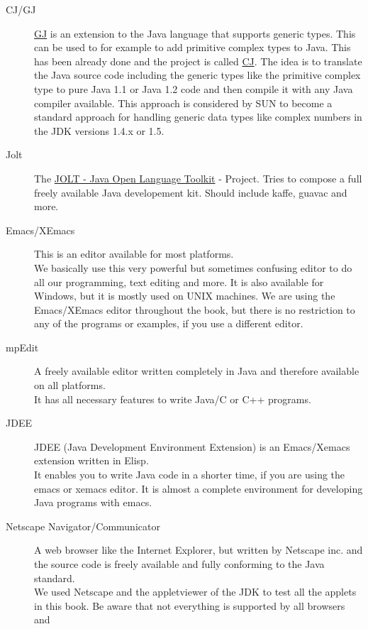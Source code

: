 \begin{description}
\item[CJ/GJ]  
  \href{http://wwwipd.ira.uka.de/~pizza/gj/}{GJ}
  is an extension to the Java language that supports
  generic types. This can be used to for example to add primitive
  complex types to Java. This has been already done and the project
  is called \href{http://wwwipd.ira.uka.de/~gunthner}{CJ}. 
  The idea is to translate the Java source code including
  the generic types like the primitive complex type to pure Java 1.1
  or Java 1.2 code and then compile it with any Java compiler available.
  This approach is considered by SUN to become a standard approach
  for handling generic data types like complex numbers 
  in the JDK versions 1.4.x or 1.5.
\item[Jolt] The \href{http://www.redhat.com/}
  {JOLT - Java Open Language Toolkit} - Project. Tries to
  compose a full freely available Java developement kit. Should
  include kaffe, guavac and more.
\item[Emacs/XEmacs] 
  This is an editor available for most platforms.\\
  We basically use this very powerful but sometimes confusing
  editor to do all our programming, text editing and more. It is
  also available for Windows, but it is mostly used on UNIX machines.
  We are using the Emacs/XEmacs editor throughout the book, but 
  there is no restriction to any of the programs or examples, if
  you use a different editor.
\item[mpEdit]  A freely available editor written completely in Java and
  therefore available on all platforms.\\ 
  It has all necessary features to write Java/C or C++ programs.
\item[JDEE]  JDEE (Java Development Environment Extension) 
  is an Emacs/Xemacs extension
  written in Elisp. \\
  It enables you to write Java code in a shorter time, if you are
  using the emacs or xemacs editor. It is almost a complete environment for
  developing Java programs with emacs.
\item[Netscape Navigator/Communicator] 
  A web browser like the Internet 
  Explorer, but written by Netscape inc. and the source code is
  freely available and fully conforming to the Java standard. \\
  We used Netscape and the appletviewer of the JDK to test all
  the applets in this book.
  Be aware that not everything is supported by all browsers and

\end{description}
